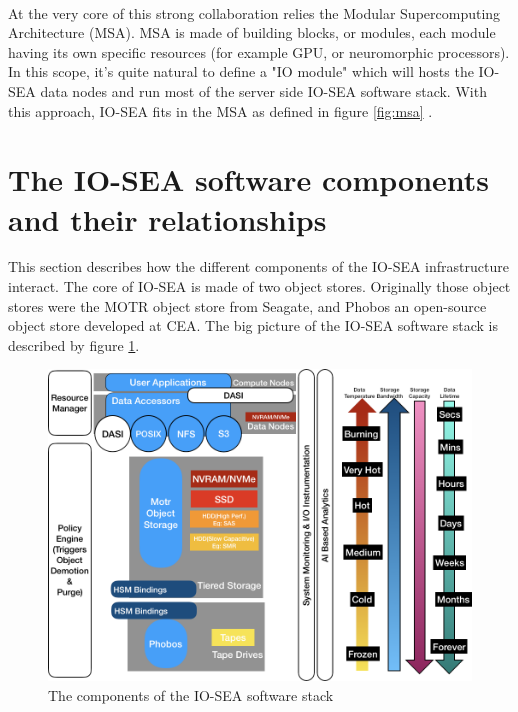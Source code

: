 \paragraph{}
At the very core of this strong collaboration relies the Modular Supercomputing Architecture (MSA). MSA is made
of building blocks, or modules, each module having its own specific resources (for example GPU, or neuromorphic
processors). In this scope, it's quite natural to define a "IO module" which will hosts the IO-SEA data nodes
and run most of the server side IO-SEA software stack. With this approach, IO-SEA fits in the MSA as defined 
in figure \ref{fig:msa} . 


\section{The IO-SEA software components and their relationships}

This section describes how the different components of the IO-SEA infrastructure interact. The core of IO-SEA is
made of two object stores. Originally those object stores were the MOTR object store from Seagate, and Phobos an
open-source object store developed at CEA. The big picture of the IO-SEA software stack is described by figure
\ref{fig:iosea-sw-stack}. 

\begin{figure}[ht]
    \centering
    \includegraphics[width=\textwidth]{FIGS/iosea-swstack.png}
    \caption[IO-SEA software stack]{ The components of the IO-SEA software stack}
    \label{fig:iosea-sw-stack}
\end{figure}


